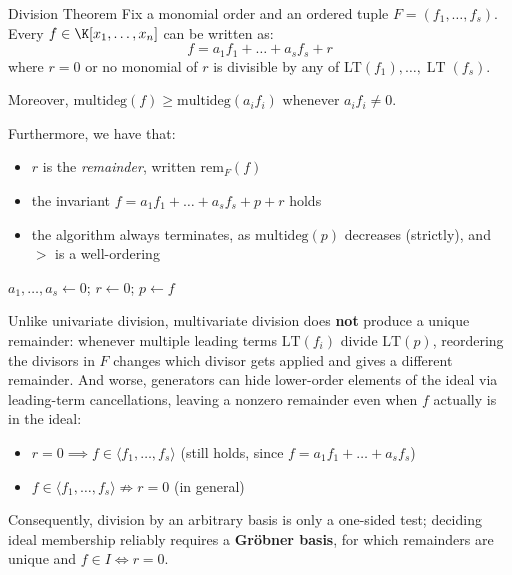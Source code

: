 \documentclass[a4paper, 11pt]{report}
\newcommand{\LT}{\operatorname{LT}}
\begin{document}
\begin{thmframe}{Division Theorem}{}
    Fix a monomial order and an ordered tuple $F = (f_{1}, \dots , f_{s})$. Every $f \in \K[x_1, \dots , x_{n}]$ can be written as:
    $$ f = a_1 f_1 + \dots + a_{s} f_{s} + r $$
    where $r = 0$ or no monomial of $r$ is divisible by any of LT$(f_1), \dots , \LT(f_{s})$.

    Moreover, $\text{multideg}(f) \geq \text{multideg}(a_{i}f_{i})$ whenever $a_{i}f_{i} \neq 0$.
\end{thmframe}

Furthermore, we have that:
\begin{itemize}
    \item $r$ is the \textit{remainder}, written $\text{rem}_{F}(f)$
    \item the invariant $f = a_{1}f_1 + \dots + a_{s} f_{s} + p + r$ holds
    \item the algorithm always terminates, as $\text{multideg}(p)$ decreases (strictly), and $>$ is a well-ordering
\end{itemize}

\begin{algorithm}[H]
\NoCaptionOfAlgo
\caption{Multivariate Division}
$a_1, \dots, a_s \leftarrow 0$; \quad $r \leftarrow 0$; \quad $p \leftarrow f$\;
\end{algorithm}

Unlike univariate division, multivariate division does \textbf{not} produce a unique remainder: whenever multiple leading terms $\mathrm{LT}(f_i)$ divide $\mathrm{LT}(p)$, reordering the divisors in $F$ changes which divisor gets applied and gives a different remainder. And worse, generators can hide lower-order elements of the ideal via leading-term cancellations, leaving a nonzero remainder even when $f$ actually is in the ideal:
\begin{itemize}
    \item $r = 0 \implies f \in \langle f_1, \dots, f_s \rangle$ \quad (still holds, since $f = a_1 f_1 + \dots + a_s f_s$)
    \item $f \in \langle f_1, \dots, f_s \rangle \not\Rightarrow r = 0$ \quad (in general)
\end{itemize}
Consequently, division by an arbitrary basis is only a one-sided test; deciding ideal membership reliably requires a \textbf{Gr\"obner basis}, for which remainders are unique and $f \in I \iff r = 0$.
\end{document}
